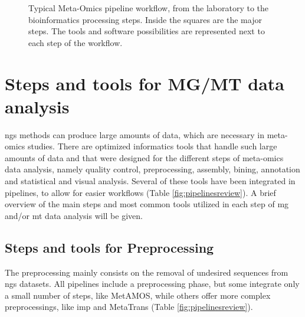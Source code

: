 \documentclass[
  oneside,
  11pt, a4paper,
  footinclude=true,
  headinclude=true,
  cleardoublepage=empty
]{scrbook}
\begin{document}
\begin{figure}[ph!]
    \caption{Typical Meta-Omics pipeline workflow, from the laboratory to the bioinformatics processing steps. Inside the squares are the major steps. The tools and software possibilities are represented next to each step of the workflow.}
    \label{fig:pipelinedesign}
    \end{figure}
    
    \section{Steps and tools for MG/MT data analysis}
    
    \gls{ngs} methods can produce large amounts of data, which are necessary in meta-omics studies. There are optimized informatics tools that handle such large amounts of data and that were designed for the different steps of meta-omics data analysis, namely quality control, preprocessing, assembly, bining, annotation and statistical and visual analysis. Several of these tools have been integrated in pipelines, to allow for easier workflows (Table \ref{fig:pipelinesreview}). A brief overview of the main steps and most common tools utilized in each step of \gls{mg} and/or \gls{mt} data analysis will be given.
    
    \subsection{Steps and tools for Preprocessing}
    
    The preprocessing mainly consists on the removal of undesired sequences from \gls{ngs} datasets. All pipelines include a preprocessing phase, but some integrate only a small number of steps, like MetAMOS, while others offer more complex preprocessings, like \gls{imp} and MetaTrans (Table  \ref{fig:pipelinesreview}).
    
\end{document}
